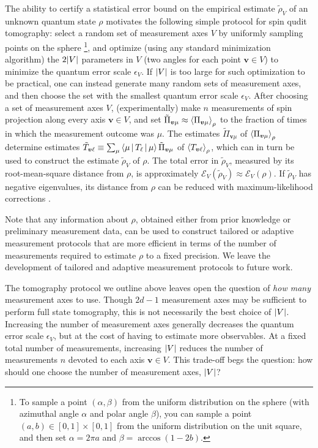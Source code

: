 \documentclass[notitlepage,twocolumn]{revtex4-2}
\newcommand{\p}[1]{\left(#1\right)} %
\newcommand{\bk}{\Braket} %
\renewcommand{\v}{\bm} %
\newcommand{\E}{\mathcal{E}}
\begin{document}
The ability to certify a statistical error bound on the empirical estimate $\tilde\rho_V$ of an unknown quantum state $\rho$ motivates the following simple protocol for spin qudit tomography: select a random set of measurement axes $V$ by uniformly sampling points on the sphere \footnote{To sample a point $\p{\alpha,\beta}$ from the uniform distribution on the sphere (with azimuthal angle $\alpha$ and polar angle $\beta$), you can sample a point $\p{a,b}\in[0,1]\times[0,1]$ from the uniform distribution on the unit square, and then set $\alpha=2\pi a$ and $\beta=\arccos\p{1-2b}$.}, and optimize (using any standard minimization algorithm) the $2\abs{V}$ parameters in $V$ (two angles for each point $\v v\in V$) to minimize the quantum error scale $\epsilon_V$.
If $\abs{V}$ is too large for such optimization to be practical, one can instead generate many random sets of measurement axes, and then choose the set with the smallest quantum error scale $\epsilon_V$.
After choosing a set of measurement axes $V$, (experimentally) make $n$ measurements of spin projection along every axis $\v v\in V$, and set $\tilde\Pi_{\v v\mu}\approx\bk{\Pi_{\v v\mu}}_\rho$ to the fraction of times in which the measurement outcome was $\mu$.
The estimates $\tilde\Pi_{\v v\mu}$ of $\bk{\Pi_{\v v\mu}}_\rho$ determine estimates $\tilde T_{\v v\ell} \equiv \sum_\mu \bk{\mu|T_\ell|\mu}\tilde\Pi_{\v v\mu}$ of $\bk{T_{\v v\ell}}_\rho$, which can in turn be used to construct the estimate $\tilde\rho_V$ of $\rho$.
The total error in $\tilde\rho_V$, measured by its root-mean-square distance from $\rho$, is approximately $\E_V\p{\tilde\rho_V}\approx\E_V\p{\rho}$.
If $\tilde\rho_V$ has negative eigenvalues, its distance from $\rho$ can be reduced with maximum-likelihood corrections \cite{smolin2012efficient}.

Note that any information about $\rho$, obtained either from prior knowledge or preliminary measurement data, can be used to construct tailored or adaptive measurement protocols \cite{pereira2018adaptive} that are more efficient in terms of the number of measurements required to estimate $\rho$ to a fixed precision.
We leave the development of tailored and adaptive measurement protocols to future work.

The tomography protocol we outline above leaves open the question of {\it how many} measurement axes to use.
Though $2d-1$ measurement axes may be sufficient to perform full state tomography, this is not necessarily the best choice of $\abs{V}$.
Increasing the number of measurement axes generally decreases the quantum error scale $\epsilon_V$, but at the cost of having to estimate more observables.
At a fixed total number of measurements, increasing $\abs{V}$ reduces the number of measurements $n$ devoted to each axis $\v v\in V$.
This trade-off begs the question: how should one choose the number of measurement axes, $\abs{V}$?
\end{document}
